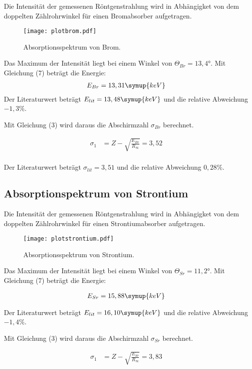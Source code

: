 Die Intensität der gemessenen Röntgenstrahlung wird in Abhängigket von dem doppelten Zählrohrwinkel für
einen Bromabsorber aufgetragen.

\begin{figure}[H]
  \centering
  \texttt{[image: plotbrom.pdf]}
  \caption{Absorptionsspektrum von Brom.}
  \label{fig:plot}
\end{figure}

Das Maximum der Intensität liegt bei einem Winkel von $\Theta_{Br} = 13,4°$.
Mit Gleichung (7) beträgt die Energie:
\begin{align*}
  E_{Br} = 13,31 \symup{keV}
\end{align*}
Der Literaturwert beträgt $E_{lit} = 13,48 \symup{keV}$ und die relative Abweichung $-1,3\%$.

Mit Gleichung (3) wird daraus die Abschirmzahl $\sigma_{Br}$  berechnet.

\begin{align*}
  \sigma_1 &= Z - \sqrt{\frac{E_{Br}}{R_{\infty}}} = 3,52 \\
\end{align*}

Der Literaturwert beträgt $\sigma_{lit} = 3,51$ und die relative Abweichung $0,28\%$.

\subsection{Absorptionspektrum von Strontium}

Die Intensität der gemessenen Röntgenstrahlung wird in Abhängigket von dem doppelten Zählrohrwinkel für
einen Strontiumabsorber aufgetragen.

\begin{figure}[H]
  \centering
  \texttt{[image: plotstrontium.pdf]}
  \caption{Absorptionsspektrum von Strontium.}
  \label{fig:plot}
\end{figure}

Das Maximum der Intensität liegt bei einem Winkel von $\Theta_{Sr} = 11,2°$.
Mit Gleichung (7) beträgt die Energie:

\begin{align*}
  E_{Sr} = 15,88 \symup{keV}
\end{align*}

Der Literaturwert beträgt $E_{lit} = 16,10 \symup{keV}$ und die relative Abweichung $-1,4\%$.


Mit Gleichung (3) wird daraus die Abschirmzahl $\sigma_{Sr}$  berechnet.

\begin{align*}
  \sigma_1 &= Z - \sqrt{\frac{E_{Sr}}{R_{\infty}}} = 3,83 \\
\end{align*}

